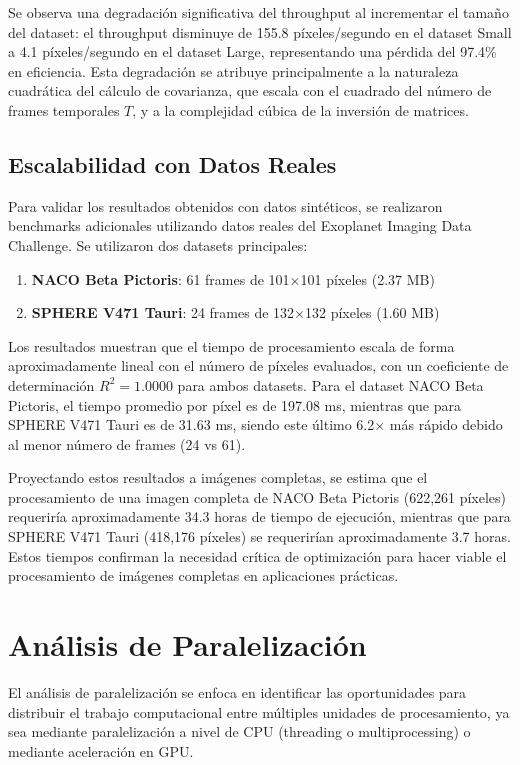 Se observa una degradación significativa del throughput al incrementar el tamaño del dataset: el throughput disminuye de 155.8 píxeles/segundo en el dataset Small a 4.1 píxeles/segundo en el dataset Large, representando una pérdida del 97.4\% en eficiencia. Esta degradación se atribuye principalmente a la naturaleza cuadrática del cálculo de covarianza, que escala con el cuadrado del número de frames temporales $T$, y a la complejidad cúbica de la inversión de matrices.

\subsection{Escalabilidad con Datos Reales}

Para validar los resultados obtenidos con datos sintéticos, se realizaron benchmarks adicionales utilizando datos reales del Exoplanet Imaging Data Challenge. Se utilizaron dos datasets principales:

\begin{enumerate}
    \item \textbf{NACO Beta Pictoris}: 61 frames de 101×101 píxeles (2.37 MB)
    \item \textbf{SPHERE V471 Tauri}: 24 frames de 132×132 píxeles (1.60 MB)
\end{enumerate}

Los resultados muestran que el tiempo de procesamiento escala de forma aproximadamente lineal con el número de píxeles evaluados, con un coeficiente de determinación $R^2 = 1.0000$ para ambos datasets. Para el dataset NACO Beta Pictoris, el tiempo promedio por píxel es de 197.08 ms, mientras que para SPHERE V471 Tauri es de 31.63 ms, siendo este último 6.2× más rápido debido al menor número de frames (24 vs 61).

Proyectando estos resultados a imágenes completas, se estima que el procesamiento de una imagen completa de NACO Beta Pictoris (622,261 píxeles) requeriría aproximadamente 34.3 horas de tiempo de ejecución, mientras que para SPHERE V471 Tauri (418,176 píxeles) se requerirían aproximadamente 3.7 horas. Estos tiempos confirman la necesidad crítica de optimización para hacer viable el procesamiento de imágenes completas en aplicaciones prácticas.

\section{Análisis de Paralelización}

El análisis de paralelización se enfoca en identificar las oportunidades para distribuir el trabajo computacional entre múltiples unidades de procesamiento, ya sea mediante paralelización a nivel de CPU (threading o multiprocessing) o mediante aceleración en GPU.

